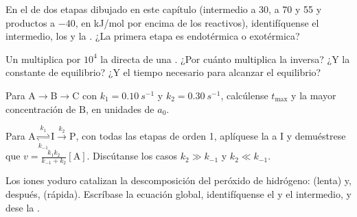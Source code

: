 \begin{exercise}[$\star$]\label{exo:b1:elementary-steps:3}
En el  de dos etapas dibujado en este capítulo
(intermedio a 30,  a 70 y 55 y productos a $-40$, en
\unit{kJ/mol} por encima de los reactivos), identifíquense el intermedio,
los  y la . ¿La
primera etapa es endotérmica o exotérmica?
\end{exercise}

\begin{exercise}[$\star$]\label{exo:b1:elementary-steps:4}
Un  multiplica por $10^4$ la  directa de
una . ¿Por cuánto multiplica la 
inversa? ¿Y la constante de equilibrio? ¿Y el tiempo necesario para
alcanzar el equilibrio?
\end{exercise}

\begin{exercise}[$\star\star$]\label{exo:b1:elementary-steps:5}
Para $\mathrm{A} \to \mathrm{B} \to \mathrm{C}$ con $k_1 =
\qty{0.10}{s^{-1}}$ y $k_2 = \qty{0.30}{s^{-1}}$, calcúlense $t_{\max}$ y
la mayor concentración de $\mathrm{B}$, en unidades de $a_0$.
\end{exercise}

\begin{exercise}[$\star\star$]\label{exo:b1:elementary-steps:6}
Para $\mathrm{A} \underset{k_{-1}}{\overset{k_1}{\rightleftharpoons}}
\mathrm{I} \xrightarrow{k_2} \mathrm{P}$, con todas las etapas de orden 1,
aplíquese la  a $\mathrm{I}$ y
demuéstrese que $v =
\frac{k_1k_2}{k_{-1} + k_2}[\mathrm{A}]$. Discútanse los casos $k_2 \gg
k_{-1}$ y $k_2 \ll k_{-1}$.
\end{exercise}

\begin{exercise}[$\star\star$]\label{exo:b1:elementary-steps:7}
Los iones yoduro catalizan la descomposición del peróxido de hidrógeno:
 (lenta) y, después,
 (rápida). Escríbase la ecuación global,
identifíquense el  y el intermedio, y dese la .
\end{exercise}

